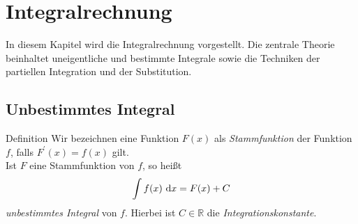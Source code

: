 \section{Integralrechnung}
In diesem Kapitel wird die Integralrechnung vorgestellt.
Die zentrale Theorie beinhaltet uneigentliche und bestimmte Integrale sowie die Techniken der partiellen Integration und der Substitution.


\subsection{Unbestimmtes Integral}

\begin{mybox}{Definition}
Wir bezeichnen eine Funktion $F(x)$ als 
\textit{Stammfunktion} der Funktion $f$,
falls $F^\prime(x) = f(x)$ gilt.\\
Ist $F$ eine Stammfunktion von $f$, so heißt
\begin{align*}
\int f(x) \ \text{\rmfamily d} x = F(x) + C
\end{align*}
\textit{unbestimmtes Integral} von $f$.
Hierbei ist $C \in \mathbb{R}$ die \textit{Integrationskonstante}.
\end{mybox}

